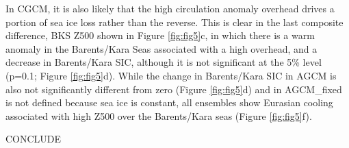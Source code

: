 \documentclass{nature}
\begin{document}


In CGCM, it is also likely that the high circulation anomaly overhead drives a portion of sea ice loss rather than the reverse. This is clear in the last composite difference, BKS Z500 shown in Figure \ref{fig:fig5}c, in which there is a warm anomaly in the Barents/Kara Seas associated with a high overhead, and a decrease in Barents/Kara SIC, although it is not significant at the 5\% level (p=0.1; Figure \ref{fig:fig5}d). While the change in Barents/Kara SIC in AGCM is also not significantly different from zero (Figure \ref{fig:fig5}d) and in AGCM\_fixed is not defined because sea ice is constant, all ensembles show Eurasian cooling associated with high Z500 over the Barents/Kara seas (Figure \ref{fig:fig5}f).

CONCLUDE
\end{document}
